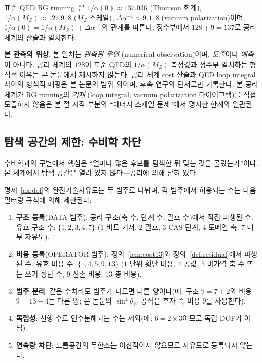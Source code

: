 \documentclass[entropy,article,submit,pdftex,oneauthor]{Definitions/mdpi}
\begin{document}
표준 QED RG running~\cite{pdg2024}은 $1/\alpha(0) \approx 137.036$ (Thomson 한계), $1/\alpha(M_Z) \approx 127.918$ ($M_Z$ 스케일), $\Delta\alpha^{-1} \approx 9.118$ (vacuum polarization)이며, $1/\alpha(0) = 1/\alpha(M_Z) + \Delta\alpha^{-1}$의 관계를 따른다. 정수부에서 $128 + 9 = 137$로 공리 체계의 산술과 일치한다.

\textbf{본 관측의 위상}. 본 일치는 \emph{관측된 우연} (numerical observation)이며, \emph{도출}이나 \emph{예측}이 아니다. 공리 체계의 $128$이 표준 QED의 $1/\alpha(M_Z)$ 측정값과 정수부 일치하는 형식적 이유는 본 논문에서 제시하지 않는다. 공리 체계 cost 산술과 QED loop integral 사이의 형식적 매핑은 본 논문의 범위 외이며, 후속 연구의 단서로만 기록한다. 본 공리 체계가 RG running의 \emph{기제} (loop integral, vacuum polarization 다이어그램)를 직접 도출하지 않음은 본 절 시작 부분의 ``에너지 스케일 문제''에서 명시한 한계와 일관된다.

\subsection{탐색 공간의 제한: 수비학 차단}

수비학과의 구별에서 핵심은 ``얼마나 많은 후보를 탐색한 뒤 맞는 것을 골랐는가''이다. 본 체계에서 탐색 공간은 열려 있지 않다---공리에 의해 닫혀 있다.

명제~\ref{ax:dof}의 완전기술자유도는 두 범주로 나뉘며, 각 범주에서 허용되는 수는 다음 필터링 규칙에 의해 제한된다:
\begin{enumerate}
\item \textbf{구조 등록}(DATA 범주): 공리 구조(축 수, 단계 수, 괄호 수)에서 직접 파생된 수. 유효 구조 수: $\{1, 2, 3, 4, 7\}$ ($1$ 비트 기저, $2$ 괄호, $3$ CAS 단계, $4$ 도메인 축, $7$ 내부 자유도).
\item \textbf{비용 등록}(OPERATOR 범주): 정의~\ref{lem:cost13}와 정의~\ref{def:residual}에서 파생된 수. 유효 비용 수: $\{1, 4, 5, 9, 13\}$ ($1$ 단위 횡단 비용, $4$ 공값, $5$ 비가역 축 수 또는 쓰기 횡단 수, $9$ 잔존 비용, $13$ 총 비용).
\item \textbf{범주 분리}: 같은 수치라도 범주가 다르면 다른 양이다(예: 구조 $9 = 7+2$와 비용 $9 = 13-4$는 다른 양; 본 논문의 $\sin^2\theta_W$ 공식은 후자 즉 비용 $9$를 사용한다).
\item \textbf{독립성}: 선행 수로 인수분해되는 수는 제외(예: $6 = 2 \times 3$이므로 독립 DOF가 아님).
\item \textbf{연속량 차단}: 노름공간의 무한소는 이산적이지 않으므로 자유도로 등록되지 않는다.
\end{enumerate}
\end{document}
